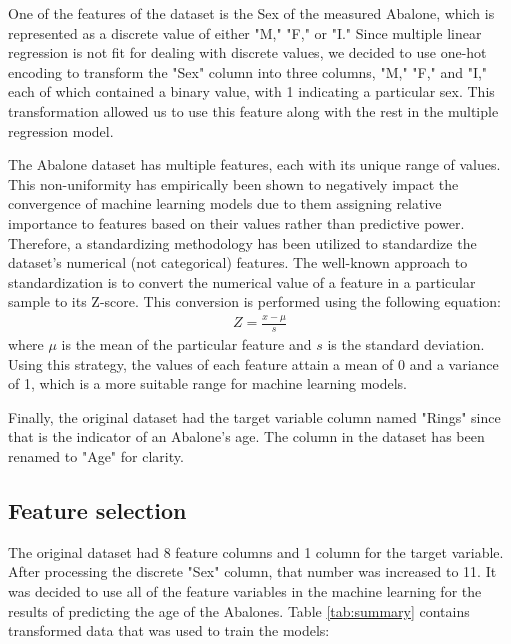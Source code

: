 \documentclass[12pt]{article}
\begin{document}
One of the features of the dataset is the Sex of the measured Abalone, which is represented as a discrete value of either "M," "F," or "I." Since multiple linear regression is not fit for dealing with discrete values, we decided to use one-hot encoding to transform the "Sex" column into three columns, "M," "F," and "I," each of which contained a binary value, with 1 indicating a particular sex. This transformation allowed us to use this feature along with the rest in the multiple regression model.

The Abalone dataset has multiple features, each with its unique range of values. This non-uniformity has empirically been shown to negatively impact the convergence of machine learning models due to them assigning relative importance to features based on their values rather than predictive power. Therefore, a standardizing methodology has been utilized to standardize the dataset's numerical (not categorical) features. The well-known approach to standardization is to convert the numerical value of a feature in a particular sample to its Z-score. This conversion is performed using the following equation:
\begin{gather*}
	Z = \frac{x - \mu}{s}
\end{gather*}
where $\mu$ is the mean of the particular feature and $s$ is the standard deviation. Using this strategy, the values of each feature attain a mean of 0 and a variance of 1, which is a more suitable range for machine learning models.

Finally, the original dataset had the target variable column named "Rings" since that is the indicator of an Abalone's age. The column in the dataset has been renamed to "Age" for clarity.

\subsection{Feature selection}

The original dataset had 8 feature columns and 1 column for the target variable. After processing the discrete "Sex" column, that number was increased to 11. It was decided to use all of the feature variables in the machine learning for the results of predicting the age of the Abalones. Table \ref{tab:summary} contains transformed data that was used to train the models:
\end{document}
